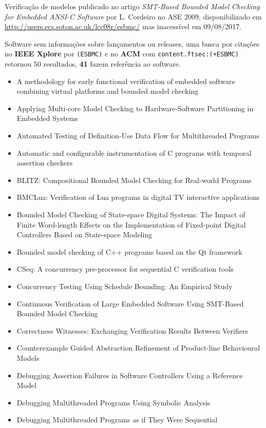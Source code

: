 Verificação de modelos
publicado no artigo {\it SMT-Based Bounded Model Checking for Embedded ANSI-C Software}
por L. Cordeiro
no ASE 2009,
disponibilizado em \url{http://users.ecs.soton.ac.uk/lcc08r/esbmc/}
mas inacessível em 09/08/2017.

Software sem informações sobre lançamentos ou releases,
uma busca por citações no {\bf IEEE Xplore} por
\texttt{(ESBMC)}
e no {\bf ACM} com
\texttt{content.ftsec:(+ESBMC)}
retornou
50 resultados,
{\bf 41} fazem referência ao software.

\begin{itemize}
\item A methodology for early functional verification of embedded software combining virtual platforms and bounded model checking
\item Applying Multi-core Model Checking to Hardware-Software Partitioning in Embedded Systems
\item Automated Testing of Definition-Use Data Flow for Multithreaded Programs
\item Automatic and configurable instrumentation of C programs with temporal assertion checkers
\item BLITZ: Compositional Bounded Model Checking for Real-world Programs
\item BMCLua: Verification of Lua programs in digital TV interactive applications
\item Bounded Model Checking of State-space Digital Systems: The Impact of Finite Word-length Effects on the Implementation of Fixed-point Digital Controllers Based on State-space Modeling
\item Bounded model checking of C++ programs based on the Qt framework
\item CSeq: A concurrency pre-processor for sequential C verification tools
\item Concurrency Testing Using Schedule Bounding: An Empirical Study
\item Continuous Verification of Large Embedded Software Using SMT-Based Bounded Model Checking
\item Correctness Witnesses: Exchanging Verification Results Between Verifiers
\item Counterexample Guided Abstraction Refinement of Product-line Behavioural Models
\item Debugging Assertion Failures in Software Controllers Using a Reference Model
\item Debugging Multithreaded Programs Using Symbolic Analysis
\item Debugging Multithreaded Programs as if They Were Sequential

\end{itemize}
